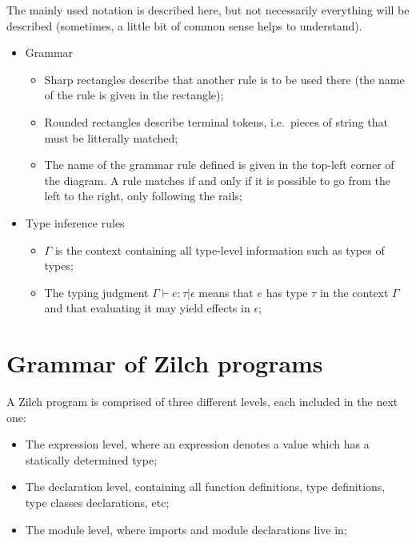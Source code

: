 The mainly used notation is described here, but not necessarily everything will be described (sometimes, a little bit of common sense helps to understand).

\begin{itemize}
	\item Grammar
	      \begin{figure}[H]
		      \centering
	      \end{figure}
	      \begin{itemize}
		      \item Sharp rectangles describe that another rule is to be used there (the name of the rule is given in the rectangle);
		      \item Rounded rectangles describe terminal tokens, i.e.\ pieces of string that must be litterally matched;
		      \item The name of the grammar rule defined is given in the top-left corner of the diagram.
		            A rule matches if and only if it is possible to go from the left to the right, only following the rails;
	      \end{itemize}
	\item Type inference rules
	      \begin{itemize}
		      \item $\Gamma$ is the context containing all type-level information such as types of types;
		      \item The typing judgment $\Gamma \vdash e : \tau \vert \epsilon$ means that $e$ has type $\tau$ in the context $\Gamma$ and that evaluating it may yield effects in $\epsilon$;
	      \end{itemize}
\end{itemize}

\chapter{Grammar of Zilch programs}\label{chap:zilch-grammar}

A Zilch program is comprised of three different levels, each included in the next one:
\begin{itemize}
	\item The expression level, where an expression denotes a value which has a statically determined type;
	\item The declaration level, containing all function definitions, type definitions, type classes declarations, etc;
	\item The module level, where imports and module declarations live in;
\end{itemize}

